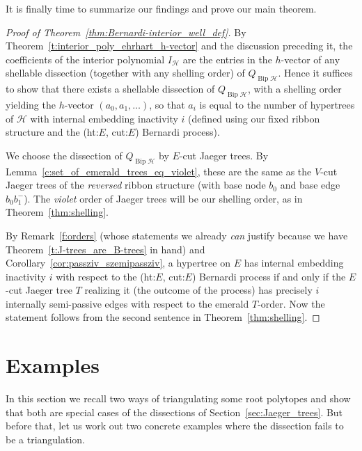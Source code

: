 \documentclass[ALCO,ThmDefs,Unicode,epreuves]{cedram}
\newcommand{\HH}{\mathcal H}
\DeclareMathOperator{\bip}{Bip}
\begin{document}
It is finally time to summarize our findings and prove our main theorem.

\begin{proof}[Proof of Theorem~\ref{thm:Bernardi-interior_well_def}]
By Theorem~\ref{t:interior_poly_ehrhart_h-vector} and the discussion preceding it, the coefficients of the interior polynomial $I_\HH$ are the entries in the $h$-vector of any shellable dissection (together with any shelling order) of $Q_{\bip \HH}$. Hence it suffices to show that there exists a shellable dissection of $Q_{\bip \HH}$, with a shelling order yielding the $h$-vector $(a_0,a_1,\dots )$, so that $a_i$ is equal to the number of hypertrees of $\HH$ with internal embedding inactivity $i$ (defined using our fixed ribbon structure and the (ht:$E$, cut:$E$) Bernardi process).

We choose the dissection of $Q_{\bip \HH}$ by $E$-cut Jaeger trees. By Lemma~\ref{c:set_of_emerald_trees_eq_violet}, these are the same as the $V$-cut Jaeger trees of the \emph{reversed} ribbon structure (with base node $b_0$ and base edge $b_0b_1^-$). The \emph{violet} order of Jaeger trees will be our shelling order, as in Theorem~\ref{thm:shelling}.

By Remark~\ref{f:orders} (whose statements we already \emph{can} justify because we have Theorem~\ref{t:J-trees_are_B-trees} in hand) and Corollary~\ref{cor:passziv_szemipassziv}, a hypertree on $E$ has internal embedding inactivity $i$ with respect to the (ht:$E$, cut:$E$) Bernardi process if and only if the $E$-cut Jaeger tree $T$ realizing it (\ie the outcome of the process) has precisely $i$ internally semi-passive edges with respect to the emerald $T$-order. Now the statement follows from the second sentence in Theorem~\ref{thm:shelling}.
\end{proof}



\section{Examples}
\label{sec:examples}

In this section we recall two ways of triangulating some root polytopes and show that both are special cases of the dissections of Section~\ref{sec:Jaeger_trees}. But before that, let us work out two concrete examples where the dissection fails to be a triangulation.
\end{document}

